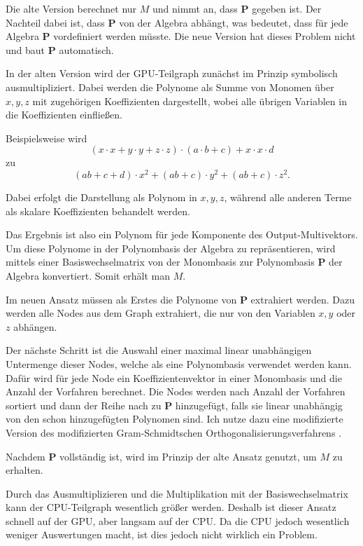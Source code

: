 \documentclass[
	ngerman,%
	accentcolor=9c,%
	ruledheaders=section,%
	class=report,%
	thesis={type=bachelor},%
	fontsize=11pt,%
	parskip=half-,%
	custommargins=true,%
	marginpar=false,%
]{tudapub}
\begin{document}
Die alte Version berechnet nur $M$ und nimmt an, dass $\mathbf{P}$ gegeben ist. Der Nachteil dabei ist, dass $\mathbf{P}$ von der Algebra abhängt, was bedeutet, dass für jede Algebra $\mathbf{P}$ vordefiniert werden müsste. Die neue Version hat dieses Problem nicht und baut $\mathbf{P}$ automatisch.  

In der alten Version wird der GPU-Teilgraph zunächst im Prinzip symbolisch ausmultipliziert. Dabei werden die Polynome als Summe von Monomen über $x, y, z$ mit zugehörigen Koeffizienten dargestellt, wobei alle übrigen Variablen in die Koeffizienten einfließen.  

Beispielsweise wird
\[
(x \cdot x + y \cdot y + z \cdot z)\cdot (a \cdot b + c) + x \cdot x \cdot d
\]
zu
\[
(ab + c + d)\cdot x^2 + (ab + c)\cdot y^2 + (ab + c)\cdot z^2.
\]

Dabei erfolgt die Darstellung als Polynom in $x, y, z$, während alle anderen Terme als skalare Koeffizienten behandelt werden.  

Das Ergebnis ist also ein Polynom für jede Komponente des Output-Multivektors.  
Um diese Polynome in der Polynombasis der Algebra zu repräsentieren, wird mittels einer Basiswechselmatrix von der Monombasis zur Polynombasis $\mathbf{P}$ der Algebra konvertiert. Somit erhält man $M$.  

Im neuen Ansatz müssen als Erstes die Polynome von $\mathbf{P}$ extrahiert werden. Dazu werden alle Nodes aus dem Graph extrahiert, die nur von den Variablen $x, y$ oder $z$ abhängen.  

Der nächste Schritt ist die Auswahl einer maximal linear unabhängigen Untermenge dieser Nodes, welche als eine Polynombasis verwendet werden kann. Dafür wird für jede Node ein Koeffizientenvektor in einer Monombasis und die Anzahl der Vorfahren berechnet.  
Die Nodes werden nach Anzahl der Vorfahren sortiert und dann der Reihe nach zu $\mathbf{P}$ hinzugefügt, falls sie linear unabhängig von den schon hinzugefügten Polynomen sind. Ich nutze dazu eine modifizierte Version des modifizierten Gram-Schmidtschen Orthogonalisierungsverfahrens \cite{wikipedia_gram_schmidt}.  

Nachdem $\mathbf{P}$ vollständig ist, wird im Prinzip der alte Ansatz genutzt, um $M$ zu erhalten.  

Durch das Ausmultiplizieren und die Multiplikation mit der Basiswechselmatrix kann der CPU-Teilgraph wesentlich größer werden. Deshalb ist dieser Ansatz schnell auf der GPU, aber langsam auf der CPU. 
Da die CPU jedoch wesentlich weniger Auswertungen macht, ist dies jedoch nicht wirklich ein Problem.  
\end{document}

